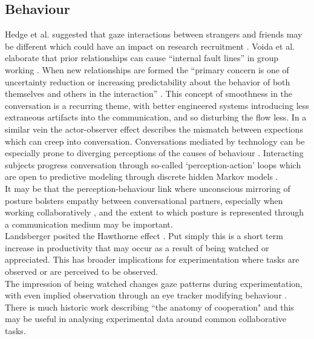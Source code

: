 \subsection{Behaviour}
Hedge et al. suggested that gaze interactions between strangers and friends may be different which could have an impact on research recruitment \cite{Hedge1978}. Voida et al. elaborate that prior relationships can cause ``internal fault lines'' in group working \cite{Voida2012}. %
When new relationships are formed the “primary concern is one of uncertainty reduction or increasing predictability about the behavior of both themselves and others in the interaction” \cite{berger1975some}. This concept of smoothness in the conversation is a recurring theme, with better engineered systems introducing less extraneous artifacts into the communication, and so disturbing the flow less. In a similar vein the actor-observer effect describes the mismatch between expections which can creep into conversation. Conversations mediated by technology can be especially prone to diverging perceptions of the causes of behaviour \cite{Jones1971}.%
Interacting subjects progress conversation through so-called `perception-action' loops which are open to predictive modeling through discrete hidden Markov models \cite{Mihoub2015}.\\
It may be that the perception-behaviour link where unconscious mirroring of posture bolsters empathy between conversational partners, especially when working collaboratively \cite{Chartrand1999}, and the extent to which posture is represented through a communication medium may be important.\\
Landsberger posited the Hawthorne effect \cite{Parsons922}. Put simply this is a short term increase in productivity that may occur as a result of being watched or appreciated. This has broader implications for experimentation where tasks are observed or are perceived to be observed.\\
The impression of being watched changes gaze patterns during experimentation, with even implied observation through an eye tracker modifying behaviour \cite{risko2011eyes}.\\
There is much historic work describing ``the anatomy of cooperation" \cite{Kollock1998} and this may be useful in analysing experimental data around common collaborative tasks.\\
